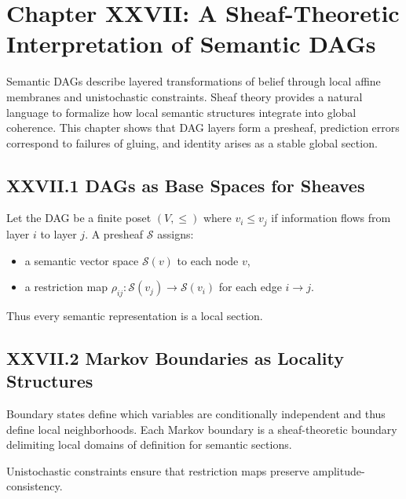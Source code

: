 \documentclass[12pt,letterpaper]{article}
\begin{document}
\newpage

\section{Chapter XXVII: A Sheaf-Theoretic Interpretation of Semantic DAGs}

Semantic DAGs describe layered transformations of belief through local affine membranes and unistochastic constraints. Sheaf theory provides a natural language to formalize how local semantic structures integrate into global coherence. This chapter shows that DAG layers form a presheaf, prediction errors correspond to failures of gluing, and identity arises as a stable global section.

\subsection{XXVII.1 DAGs as Base Spaces for Sheaves}

Let the DAG be a finite poset $(V,\le)$ where $v_i \le v_j$ if information flows from layer $i$ to layer $j$. A presheaf $\mathcal{S}$ assigns:

\begin{itemize}
    \item a semantic vector space $\mathcal{S}(v)$ to each node $v$,
    \item a restriction map $\rho_{ij} : \mathcal{S}(v_j)\to\mathcal{S}(v_i)$ for each edge $i\to j$.
\end{itemize}

Thus every semantic representation is a local section.

\subsection{XXVII.2 Markov Boundaries as Locality Structures}

Boundary states define which variables are conditionally independent and thus define local neighborhoods. Each Markov boundary is a sheaf-theoretic boundary delimiting local domains of definition for semantic sections.

Unistochastic constraints ensure that restriction maps preserve amplitude-consistency.
\end{document}
